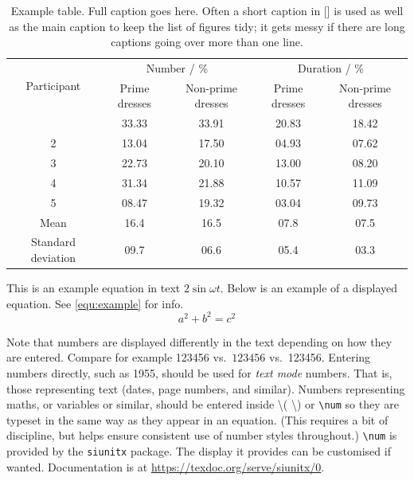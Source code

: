     \begin{table}
      \centering
      \caption[Short caption for list of tables]{Example table. Full caption goes here. Often a short caption in [] is used as well as the main caption to keep the list of figures tidy; it gets messy if there are long captions going over more than one line.}
      \label{table:example_tabular}
      \begin{tabular}{ccccc}
        \toprule
        \multirow{2}{*}{Participant} & \multicolumn{2}{c}{Number / \%} & \multicolumn{2}{c}{Duration / \%} \\
                                     & Prime dresses & Non-prime dresses & Prime dresses & Non-prime dresses \\
	  \otoprule
        1  & 33.33 & 33.91 & 20.83 & 18.42 \\
        2  & 13.04 & 17.50 & 04.93 & 07.62 \\
        3  & 22.73 & 20.10 & 13.00 & 08.20 \\
        4  & 31.34 & 21.88 & 10.57 & 11.09 \\
        5  & 08.47 & 19.32 & 03.04 & 09.73 \\
        \hline
        Mean & 16.4 & 16.5 & 07.8 & 07.5 \\
        Standard deviation & 09.7 & 06.6 & 05.4 & 03.3 \\
        \bottomrule
      \end{tabular}
    \end{table}
  
    This is an example equation in text \(2\sin{\omega t}\). Below is an example of a displayed equation. See \autoref{equ:example} for info.
    \begin{equation}
        a^{2} + b^{2} = c^{2} \label{equ:example}
    \end{equation}

    Note that numbers are displayed differently in the text depending on how they are entered. Compare for example 123456 vs.\ \(123456\) vs.\ \num{123456}. Entering numbers directly, such as 1955, should be used for \emph{text mode} numbers. That is, those representing text (dates, page numbers, and similar). Numbers representing maths, or variables or similar, should be entered inside \textbackslash( \textbackslash) or \lstinline{\num} so they are typeset in the same way as they appear in an equation. (This requires a bit of discipline, but helps ensure consistent use of number styles throughout.) \lstinline{\num} is provided by the \lstinline{siunitx} package. The display it provides can be customised if wanted. Documentation is at \url{https://texdoc.org/serve/siunitx/0}.

